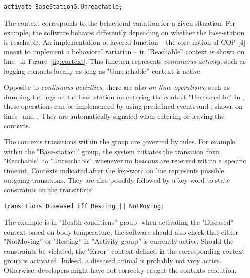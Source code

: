 \vspace{-1mm}
\begin{lstlisting}[language=conesc]
activate BaseStationG.Unreachable;
\end{lstlisting}
\vspace{-1.5mm}

The context corresponds to the behavioral variation for a given situation. For
example, the software behaves differently depending on whether the base-station
is reachable. An implementation of layered function -- the core notion of COP
[4] meant to implement a behavioral variation -- in "Reachable'' context is
shown on line~ in Figure~\ref{fig:context}. This function
represents \emph{continuous activity}, such as logging contacts locally as long
as "Unreachable'' context is active.

Opposite to \emph{continuous activities}, there are also \emph{on-time
operations}, such as dumping the logs on the base-station on entering the
context "Unreachable''. In \conesc, these operations can be implemented by using
predefined events  and , shown on
lines~ and~. They are automatically
signaled when entering or leaving the contexts.

The contexts transitions within the group are governed by rules. For example,
within the "Base-station'' group, the system initiates the transition from
"Reachable'' to "Unreachable'' whenever no beacons are received within a
specific timeout. Contexts indicated after the key-word  on
line  represents possible outgoing transitions. They are also
possibly followed by a key-word  to state constraints on the
transitions:

\vspace{-1mm}
\begin{lstlisting}[language=conesc]
transitions Diseased iff Resting || NotMoving;
\end{lstlisting}
\vspace{-1.5mm}

The example is in "Health conditions'' group: when activating the "Diseased''
context based on body temperature, the software should also check that either
"NotMoving'' or "Resting'' in "Activity group'' is currently active. Should the
constraints be violated, the "Error'' context defined in the corresponding
context group is activated. Indeed, a diseased animal is probably not very
active. Otherwise, developers might have not correctly caught the contexts
evolution.

